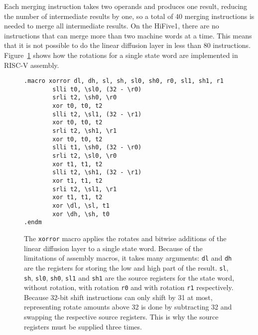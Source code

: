 Each merging instruction takes two operands and produces one result, reducing
the number of intermediate results by one, so a total of 40 merging instructions
is needed to merge all intermediate results. On the HiFive1, there are no
instructions that can merge more than two machine words at a time. This means
that it is not possible to do the linear diffusion layer in less than 80
instructions. Figure~\ref{xorror} shows how the rotations for a single state
word are implemented in RISC-V assembly.

\begin{figure}
\begin{verbatim}
.macro xorror dl, dh, sl, sh, sl0, sh0, r0, sl1, sh1, r1
        slli t0, \sl0, (32 - \r0)
        srli t2, \sh0, \r0
        xor t0, t0, t2
        slli t2, \sl1, (32 - \r1)
        xor t0, t0, t2
        srli t2, \sh1, \r1
        xor t0, t0, t2
        slli t1, \sh0, (32 - \r0)
        srli t2, \sl0, \r0
        xor t1, t1, t2
        slli t2, \sh1, (32 - \r1)
        xor t1, t1, t2
        srli t2, \sl1, \r1
        xor t1, t1, t2
        xor \dl, \sl, t1
        xor \dh, \sh, t0
.endm
\end{verbatim}

\caption{The \texttt{xorror} macro applies the rotates and bitwise additions of
the linear diffusion layer to a single state word. Because of the limitations of
assembly macros, it takes many arguments:
\texttt{dl} and \texttt{dh} are the registers for storing the low and high part
of the result. \texttt{sl}, \texttt{sh}, \texttt{sl0}, \texttt{sh0},
\texttt{sl1} and \texttt{sh1} are the source registers for the state word,
without rotation, with rotation \texttt{r0} and with rotation \texttt{r1}
respectively. Because 32-bit shift instructions can only shift by 31 at most,
representing rotate amounts above 32 is done by subtracting 32 and swapping the
respective source registers. This is why the source registers must be supplied
three times.}

\label{xorror}
\end{figure}
